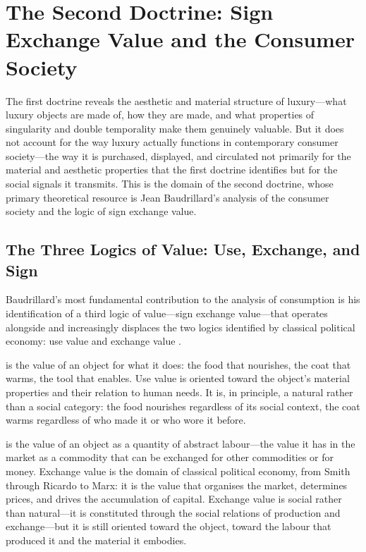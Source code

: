 \section{The Second Doctrine: Sign Exchange Value and the Consumer Society}
\label{p16:sec:baudrillard}

\noindent
The first doctrine reveals the aesthetic and material structure of luxury---what luxury objects are made of, how they are made, and what properties of singularity and double temporality make them genuinely valuable. But it does not account for the way luxury actually functions in contemporary consumer society---the way it is purchased, displayed, and circulated not primarily for the material and aesthetic properties that the first doctrine identifies but for the social signals it transmits. This is the domain of the second doctrine, whose primary theoretical resource is Jean Baudrillard's analysis of the consumer society and the logic of sign exchange value.

\subsection{The Three Logics of Value: Use, Exchange, and Sign}
\label{p16:subsec:three_logics}

\noindent
Baudrillard's most fundamental contribution to the analysis of consumption is his identification of a third logic of value---sign exchange value---that operates alongside and increasingly displaces the two logics identified by classical political economy: use value and exchange value \parencite{baudrillard1981}.

 is the value of an object for what it does: the food that nourishes, the coat that warms, the tool that enables. Use value is oriented toward the object's material properties and their relation to human needs. It is, in principle, a natural rather than a social category: the food nourishes regardless of its social context, the coat warms regardless of who made it or who wore it before.

 is the value of an object as a quantity of abstract labour---the value it has in the market as a commodity that can be exchanged for other commodities or for money. Exchange value is the domain of classical political economy, from Smith through Ricardo to Marx: it is the value that organises the market, determines prices, and drives the accumulation of capital. Exchange value is social rather than natural---it is constituted through the social relations of production and exchange---but it is still oriented toward the object, toward the labour that produced it and the material it embodies.

